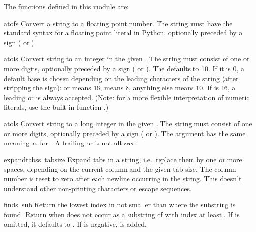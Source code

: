 The functions defined in this module are:

\renewcommand{\indexsubitem}{(in module string)}

\begin{funcdesc}{atof}{s}
Convert a string to a floating point number.  The string must have
the standard syntax for a floating point literal in Python, optionally
preceded by a sign (\samp{+} or \samp{-}).
\end{funcdesc}

\begin{funcdesc}{atoi}{s}
Convert string  to an integer in the given .  The
string must consist of one or more digits, optionally preceded by a
sign (\samp{+} or \samp{-}).  The  defaults to 10.  If it is
0, a default base is chosen depending on the leading characters of the
string (after stripping the sign):  or  means 16,
 means 8, anything else means 10.  If  is 16, a
leading  or  is always accepted.  (Note: for a more
flexible interpretation of numeric literals, use the built-in function
.)
\end{funcdesc}

\begin{funcdesc}{atol}{s}
Convert string  to a long integer in the given .  The
string must consist of one or more digits, optionally preceded by a
sign (\samp{+} or \samp{-}).  The  argument has the same
meaning as for .  A trailing  or  is not
allowed.
\end{funcdesc}

\begin{funcdesc}{expandtabs}{s\, tabsize}
Expand tabs in a string, i.e.\ replace them by one or more spaces,
depending on the current column and the given tab size.  The column
number is reset to zero after each newline occurring in the string.
This doesn't understand other non-printing characters or escape
sequences.
\end{funcdesc}

\begin{funcdesc}{find}{s\, sub}
Return the lowest index in  not smaller than  where the
substring  is found.  Return  when 
does not occur as a substring of  with index at least .
If  is omitted, it defaults to .  If  is
negative,  is added.
\end{funcdesc}

